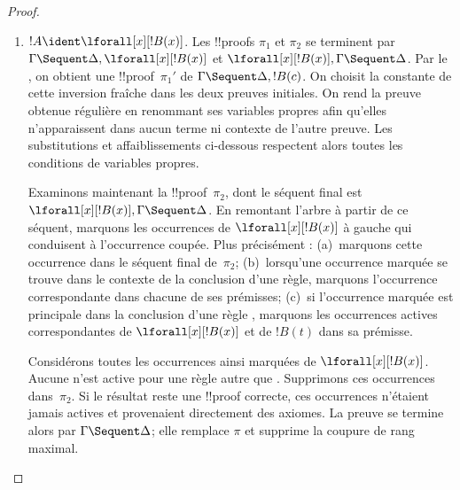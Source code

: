 \documentclass[../../../include/open-logic-section]{subfiles}
\begin{document}
\begin{proof}
\begin{enumerate}
  de $\Gamma\Sequent\Delta,!B$ et une !!{proof} $\pi_2''$
  de $!C,\Gamma\Sequent\Delta$.
  L'affaiblissement ,
  appliqué à $\pi_2''$, donne une !!{proof}~$\pi_2'''$
  de $!C,!B,\Gamma\Sequent\Delta$.
  La !!{proof}~$\pi'$ est
  \[
  \AxiomC{}
  \RightLabel{$\pi_2'$}
  \Deduce$\Gamma \fCenter \Delta, !B$
  \AxiomC{}
  \RightLabel{$\pi_1'$}
  \Deduce$!B, \Gamma \fCenter \Delta, !C$
  \AxiomC{}
  \RightLabel{$\pi_2'''$}
  \Deduce$!C, !B, \Gamma \fCenter \Delta$
  \RightLabel{\CutCS}
  \BinaryInf$!B, \Gamma \fCenter \Delta$
  \RightLabel{\CutCS}
  \BinaryInf$\Gamma \fCenter \Delta$
  \DisplayProof
  \]
  \item $!A\ident\lforall[x][!B(x)]$.
  Les !!{proof}s $\pi_1$ et $\pi_2$ se terminent par
  $\Gamma\Sequent\Delta,\lforall[x][!B(x)]$ et
  $\lforall[x][!B(x)],\Gamma\Sequent\Delta$.
  Par le , on obtient une !!{proof}~$\pi_1'$
  de $\Gamma\Sequent\Delta,!B(c)$.
  On choisit la constante de cette inversion fraîche dans
  les deux preuves initiales. On rend la preuve obtenue
  régulière en renommant ses variables propres afin qu'elles
  n'apparaissent dans aucun terme ni contexte de l'autre preuve.
  Les substitutions et affaiblissements ci-dessous respectent
  alors toutes les conditions de variables propres.

  Examinons maintenant la !!{proof}~$\pi_2$, dont le séquent
  final est $\lforall[x][!B(x)],\Gamma\Sequent\Delta$.
  En remontant l'arbre à partir de ce séquent, marquons les
  occurrences de $\lforall[x][!B(x)]$ à gauche qui conduisent
  à l'occurrence coupée. Plus précisément :
  (a)~marquons cette occurrence dans le séquent final de~$\pi_2$;
  (b)~lorsqu'une occurrence marquée se trouve dans le contexte
  de la conclusion d'une règle, marquons l'occurrence
  correspondante dans chacune de ses prémisses;
  (c)~si l'occurrence marquée est principale dans la conclusion
  d'une règle \LeftR{\lforall}, marquons les occurrences
  actives correspondantes de $\lforall[x][!B(x)]$ et de $!B(t)$
  dans sa prémisse.

  Considérons toutes les occurrences ainsi marquées de
  $\lforall[x][!B(x)]$. Aucune n'est active pour une règle autre
  que \LeftR{\lforall}. Supprimons ces occurrences dans~$\pi_2$.
  Si le résultat reste une !!{proof} correcte, ces occurrences
  n'étaient jamais actives et provenaient directement des
  axiomes. La preuve se termine alors par
  $\Gamma\Sequent\Delta$; elle remplace $\pi$ et supprime
  la coupure de rang maximal.


\end{enumerate}
\end{proof}
\end{document}
